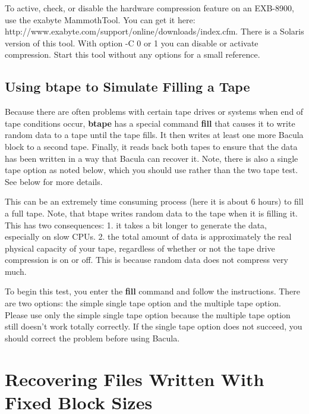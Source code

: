 To active, check, or disable the hardware compression feature
on an EXB-8900, use the exabyte MammothTool. You can get it here:
{http://www.exabyte.com/support/online/downloads/index.cfm}.
There is a Solaris version of this tool. With option -C 0 or 1 you
can disable or activate compression. Start this tool without any
options for a small reference.

\label{fill}
\subsection{Using btape to Simulate Filling a Tape}

Because there are often problems with certain tape drives or systems when end
of tape conditions occur, {\bf btape} has a special command {\bf fill} that
causes it to write random data to a tape until the tape fills. It then writes
at least one more Bacula block to a second tape. Finally, it reads back both
tapes to ensure that the data has been written in a way that Bacula can
recover it. Note, there is also a single tape option as noted below, which you
should use rather than the two tape test. See below for more details. 

This can be an extremely time consuming process (here it is about 6 hours) to
fill a full tape. Note, that btape writes random data to the tape when it is
filling it. This has two consequences: 1. it takes a bit longer to generate
the data, especially on slow CPUs. 2. the total amount of data is
approximately the real physical capacity of your tape, regardless of whether
or not the tape drive compression is on or off. This is because random data
does not compress very much. 

To begin this test, you enter the {\bf fill} command and follow the
instructions. There are two options: the simple single tape option and the
multiple tape option. Please use only the simple single tape option because
the multiple tape option still doesn't work totally correctly. If the single
tape option does not succeed, you should correct the problem before using
Bacula. 
\label{RecoveringFiles}

\section{Recovering Files Written With Fixed Block Sizes}

